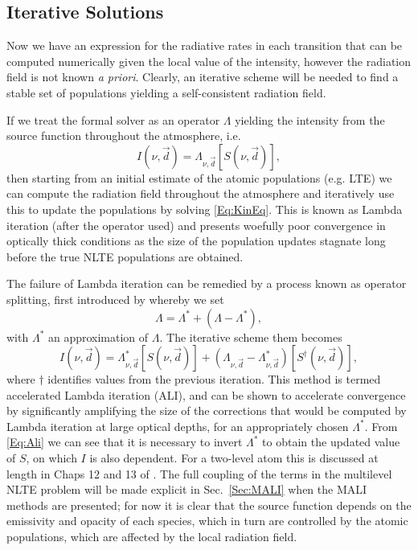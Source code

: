 \subsection{Iterative Solutions}

Now we have an expression for the radiative rates in each transition that can be computed numerically given the local value of the intensity, however the radiation field is not known \textit{a priori}.
Clearly, an iterative scheme will be needed to find a stable set of populations yielding a self-consistent radiation field.

If we treat the formal solver as an operator $\Lambda$ yielding the intensity from the source function throughout the atmosphere, i.e.
\begin{equation}
    I(\nu, \vec{d}) = \Lambda_{\nu,\vec{d}}[S(\nu, \vec{d})],
    \label{Eq:LambdaOperator}
\end{equation}
then starting from an initial estimate of the atomic populations (e.g. LTE) we can compute the radiation field throughout the atmosphere and iteratively use this to update the populations by solving \eqref{Eq:KinEq}. This is known as Lambda iteration (after the operator used) and presents woefully poor convergence in optically thick conditions as the size of the population updates stagnate long before the true NLTE populations are obtained.

The failure of Lambda iteration can be remedied by a process known as operator splitting, first introduced by \citet{Cannon1973} whereby we set
\begin{equation}
    \Lambda = \Lambda^* + (\Lambda - \Lambda^*),
\end{equation}
with $\Lambda^*$ an approximation of $\Lambda$. The iterative scheme them becomes
\begin{equation}
    I(\nu, \vec{d}) = \Lambda_{\nu, \vec{d}}^*[S(\nu, \vec{d})] + (\Lambda_{\nu, \vec{d}} - \Lambda_{\nu, \vec{d}}^*)[S^{\dagger}(\nu, \vec{d})],
    \label{Eq:Ali}
\end{equation}
where $\dagger$ identifies values from the previous iteration. This method is termed accelerated Lambda iteration (ALI), and can be shown to accelerate convergence by significantly amplifying the size of the corrections that would be computed by Lambda iteration at large optical depths, for an appropriately chosen $\Lambda^*$.
From \eqref{Eq:Ali} we can see that it is necessary to invert $\Lambda^*$ to obtain the updated value of $S$, on which $I$ is also dependent.
For a two-level atom this is discussed at length in Chaps 12 and 13 of \citet{Hubeny2014}.
The full coupling of the terms in the multilevel NLTE problem will be made explicit in Sec.~\ref{Sec:MALI} when the MALI methods are presented; for now it is clear that the source function depends on the emissivity and opacity of each species, which in turn are controlled by the atomic populations, which are affected by the local radiation field.

